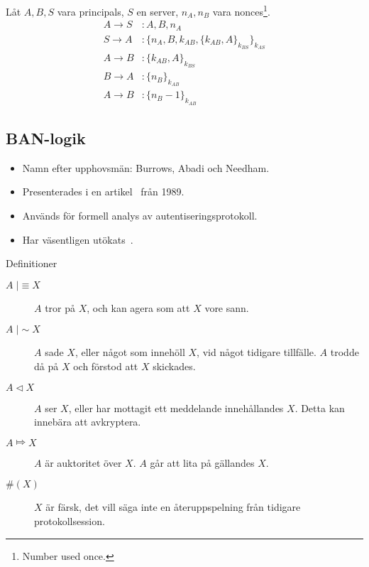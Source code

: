 \documentclass{beamer}
\theoremstyle{definition}
\theoremstyle{remark}
\DeclareMathOperator{\believes}{|\!\!\!\equiv}
\DeclareMathOperator{\said}{|\!\!\!\sim}
\DeclareMathOperator{\controls}{\Mapsto}
\DeclareMathOperator{\sees}{\lhd}
\newcommand{\fresh}[1]{\#(#1)}
\newcommand{\encrypt}[2]{\{#1\}_{#2}}
\begin{document}
\begin{frame}{\insertsubsectionhead}
  \begin{example}
    Låt \(A, B, S\) vara principals, \(S\) en server, \(n_A, n_B\) vara 
    nonces\footnote{Number used once.}.
    \begin{align*}
      A\to S &\colon A, B, n_A \\
      S\to A &\colon \encrypt{n_A, B, k_{AB}, \encrypt{k_{AB}, 
      A}{k_{BS}}}{k_{AS}} \\
      A\to B &\colon \encrypt{k_{AB}, A}{k_{BS}} \\
      B\to A &\colon \encrypt{n_B}{k_{AB}} \\
      A\to B &\colon \encrypt{n_B-1}{k_{AB}}
    \end{align*}
  \end{example}
\end{frame}

\subsection{BAN-logik}

\begin{frame}{\insertsubsectionhead}
  \begin{itemize}
    \item Namn efter upphovsmän: Burrows, Abadi och Needham.
    \item Presenterades i en artikel~\cite{BAN90alo} från 1989.
    \item Används för formell analys av autentiseringsprotokoll.
    \item Har väsentligen utökats~\cite{Syverson2001tlo}.
  \end{itemize}
\end{frame}

\begin{frame}{\insertsubsectionhead}{Definitioner}
  \begin{description}
    \item[\(A\believes X\)] \(A\) tror på \(X\), och kan agera som att \(X\) 
      vore sann.
    \item[\(A\said X\)] \(A\) sade \(X\), eller något som innehöll \(X\), vid 
      något tidigare tillfälle.
      \(A\) trodde då på \(X\) och förstod att \(X\) skickades.
    \item[\(A\sees X\)] \(A\) ser \(X\), eller har mottagit ett meddelande 
      innehållandes \(X\).
      Detta kan innebära att avkryptera.
    \item[\(A\controls X\)] \(A\) är auktoritet över \(X\).
      \(A\) går att lita på gällandes \(X\).
    \item[\(\fresh X\)] \(X\) är färsk, det vill säga inte en återuppspelning 
      från tidigare protokollsession.
  \end{description}
\end{frame}
\end{document}
